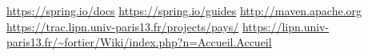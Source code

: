 \begin{thebibliography}{99}
 \url{https://spring.io/docs}
 \url{https://spring.io/guides}
 \url{http://maven.apache.org}
 \url{https://trac.lipn.univ-paris13.fr/projects/pays/}
 \url{https://lipn.univ-paris13.fr/~fortier/Wiki/index.php?n=Accueil.Accueil}
\end{thebibliography}